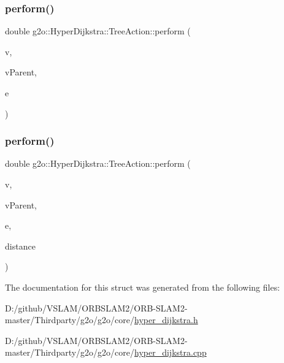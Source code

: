 \subsubsection{\texorpdfstring{perform()}{perform()}\hspace{0.1cm}{\footnotesize\ttfamily [1/2]}}
{\footnotesize\ttfamily double g2o\+::\+Hyper\+Dijkstra\+::\+Tree\+Action\+::perform (\begin{DoxyParamCaption}\item[{\mbox{\hyperlink{classg2o_1_1_hyper_graph_1_1_vertex}{Hyper\+Graph\+::\+Vertex}} $\ast$}]{v,  }\item[{\mbox{\hyperlink{classg2o_1_1_hyper_graph_1_1_vertex}{Hyper\+Graph\+::\+Vertex}} $\ast$}]{v\+Parent,  }\item[{\mbox{\hyperlink{classg2o_1_1_hyper_graph_1_1_edge}{Hyper\+Graph\+::\+Edge}} $\ast$}]{e }\end{DoxyParamCaption})\hspace{0.3cm}{\ttfamily [virtual]}}

\mbox{\label{structg2o_1_1_hyper_dijkstra_1_1_tree_action_a2f78bac199af9afea7105f3dd9f2e963}} 
\subsubsection{\texorpdfstring{perform()}{perform()}\hspace{0.1cm}{\footnotesize\ttfamily [2/2]}}
{\footnotesize\ttfamily double g2o\+::\+Hyper\+Dijkstra\+::\+Tree\+Action\+::perform (\begin{DoxyParamCaption}\item[{\mbox{\hyperlink{classg2o_1_1_hyper_graph_1_1_vertex}{Hyper\+Graph\+::\+Vertex}} $\ast$}]{v,  }\item[{\mbox{\hyperlink{classg2o_1_1_hyper_graph_1_1_vertex}{Hyper\+Graph\+::\+Vertex}} $\ast$}]{v\+Parent,  }\item[{\mbox{\hyperlink{classg2o_1_1_hyper_graph_1_1_edge}{Hyper\+Graph\+::\+Edge}} $\ast$}]{e,  }\item[{double}]{distance }\end{DoxyParamCaption})\hspace{0.3cm}{\ttfamily [virtual]}}



The documentation for this struct was generated from the following files\+:\begin{DoxyCompactItemize}
\item 
D\+:/github/\+V\+S\+L\+A\+M/\+O\+R\+B\+S\+L\+A\+M2/\+O\+R\+B-\/\+S\+L\+A\+M2-\/master/\+Thirdparty/g2o/g2o/core/\mbox{\hyperlink{hyper__dijkstra_8h}{hyper\+\_\+dijkstra.\+h}}\item 
D\+:/github/\+V\+S\+L\+A\+M/\+O\+R\+B\+S\+L\+A\+M2/\+O\+R\+B-\/\+S\+L\+A\+M2-\/master/\+Thirdparty/g2o/g2o/core/\mbox{\hyperlink{hyper__dijkstra_8cpp}{hyper\+\_\+dijkstra.\+cpp}}\end{DoxyCompactItemize}
